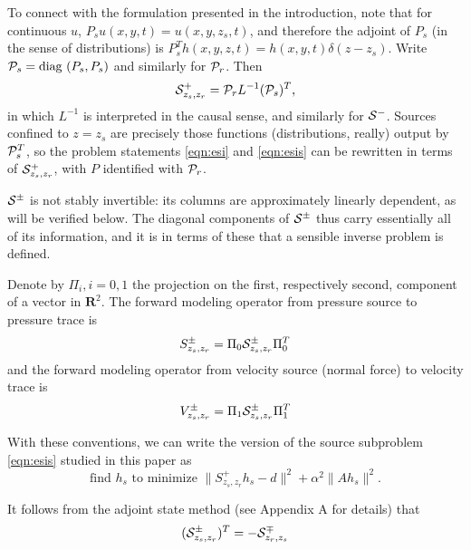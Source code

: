 \documentclass[georeport,12pt]{geophysics}
\newcommand{\bR}{\mathbf{R}}
\begin{document}
 To connect with the formulation presented in
the introduction, note that for continuous $u$,
$P_su(x,y,t)=u(x,y,z_s,t)$, and therefore the adjoint of $P_s$ (in the
sense of distributions) is $P_s^Th(x,y,z,t) =
h(x,y,t)\delta(z-z_s)$. Write ${\cal P}_s = \mbox{diag }(P_s,P_s)$ and
similarly for ${\cal P}_r$. Then
\[
  {\cal S}^{+}_{z_s,z_r} = {\cal P}_r L^{-1}({\cal P}_s)^T,
\]
in which $L^{-1}$ is interpreted in the causal sense, and similarly
for ${\cal S}^{-}$. Sources confined to $z=z_s$ are precisely those
functions (distributions, really) output by ${\cal P}_s^T$, so the
problem statements \ref{eqn:esi} and \ref{eqn:esis} can be rewritten
in terms of ${\cal S}^+_{z_s,z_r}$, with $P$ identified with ${\cal P}_r$.

${\cal S}^{\pm}$ is not stably invertible: its columns are
approximately linearly dependent, as will be verified below. The
diagonal components of ${\cal S}^{\pm}$ thus carry essentially all of
its information, and it is in terms of these that a sensible inverse problem
is defined.

Denote by $\Pi_i, i=0,1$ the projection on the first,
respectively second, component of a vector in $\bR^2$. The 
forward modeling operator from pressure source to pressure trace is
\begin{equation}
  \label{eqn:sdef}
  S^{\pm}_{z_s,z_r} = \Pi_0 {\cal S}^{\pm}_{z_s,z_r} \Pi_0^T 
\end{equation}
and the forward modeling operator from velocity source (normal force)
to velocity trace is
\begin{equation}
  \label{eqn:vdef}
  V^{\pm}_{z_s,z_r} = \Pi_1 {\cal S}^{\pm}_{z_s,z_r} \Pi_1^T 
\end{equation}

With these conventions, we can write the version of the source
subproblem \ref{eqn:esis} studied in this paper as
\begin{equation}
  \label{eqn:esisp}
  \mbox{find }h_s\mbox{ to minimize }\|S^{+}_{z_s,z_r}h_s- d\|^2 +
  \alpha^2\|Ah_s\|^2.
\end{equation}


It follows from the adjoint state method (see Appendix A for details) that
\begin{equation}
  \label{eqn:sadj1}
  ({\cal S}^{\pm}_{z_s, z_r})^T = -{\cal S}^{\mp}_{z_r,z_s}
\end{equation}
\end{document}
